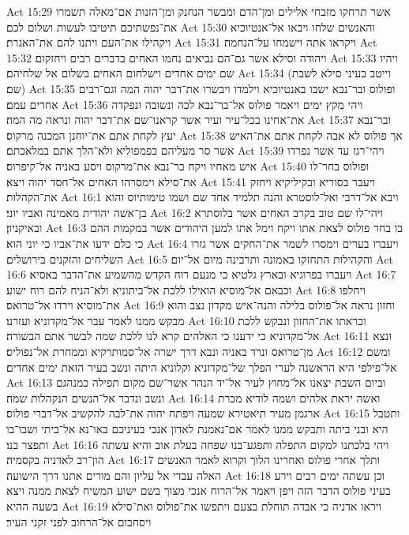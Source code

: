Act 15:29  אשר תרחקו מזבחי אלילים ומן־הדם ומבשר הנחנק ומן־הזנות אם־מאלה תשמרו את־נפשתיכם תיטיבו לעשות ושלום לכם׃
Act 15:30  והאנשים שלחו ויבאו אל־אנטיוכיא ויקהילו את־העם ויתנו להם את־האגרת׃
Act 15:31  ויקראו אתה וישמחו על־הנחמה׃
Act 15:32  ויהודה וסילא אשר גם־הם נביאים נחמו האחים בדברים רבים ויחזקום׃
Act 15:33  ויהיו שם ימים אחדים וישלחום האחים בשלום אל שלחיהם׃
Act 15:34  (וייטב בעיני סילא לשבת שם׃)
Act 15:35  ופולוס ובר־נבא ישבו באנטיוכיא וילמדו ויבשרו את־דבר יהוה המה וגם־רבים אחרים עמם׃
Act 15:36  ויהי מקץ ימים ויאמר פולוס אל־בר־נבא לכה ונשובה ונפקדה את־אחינו בכל־עיר ועיר אשר קראנו־שם את־דבר יהוה ונראה מה המה׃
Act 15:37  ובר־נבא יעץ לקחת אתם את־יוחנן המכנה מרקוס׃
Act 15:38  אך פולוס לא אבה לקחת אתם את־האיש אשר סר מעליהם בפמפוליא ולא־הלך אתם במלאכתם׃
Act 15:39  ויהי־רגז עד אשר נפרדו איש מאחיו ויקח בר־נבא את־מרקוס ויסע באניה אל־קיפרוס׃
Act 15:40  ופולוס בחר־לו את־סילא וימסרהו האחים אל־חסד יהוה ויצא׃
Act 15:41  ויעבר בסוריא ובקיליקיא ויחזק את־הקהלות׃
Act 16:1  ויבא אל־דרבי ואל־לוסטרא והנה תלמיד אחד שם ושמו טימותיוס והוא בן־אשה יהודית מאמינה ואביו יוני׃
Act 16:2  ויהי־לו שם טוב בקרב האחים אשר בלוסתרא ובאיקניון׃
Act 16:3  בו בחר פולוס לצאת אתו ויקח וימל אתו למען היהודים אשר במקמות ההם כי כלם ידעו את־אביו כי יוני הוא׃
Act 16:4  ויעברו בערים וימסרו לשמר את־החקים אשר גזרו השליחים והזקנים בירושלים׃
Act 16:5  והקהילות התחזקו באמונה ותרבינה מיום אל־יום׃
Act 16:6  ויעברו בפרוגיא ובארץ גלטיא כי מנעם רוח הקדש מהשמיע את־הדבר באסיא׃
Act 16:7  וכבאם אל־מוסיא הואילו ללכת אל־ביתוניא ולא־הניח להם רוח ישוע׃
Act 16:8  ויחלפו את־מוסיא וירדו אל־טרואס׃
Act 16:9  וחזון נראה אל־פולוס בלילה והנה־איש מקדון נצב והוא מבקש ממנו לאמר עבר אל־מקדוניא ועזרנו׃
Act 16:10  וכראתו את־החזון ונבקש ללכת אל־מקדוניא כי ידענו כי האלהים קרא לנו ללכת שמה לבשר אתם הבשורה׃
Act 16:11  ונצא מן־טרואס ונרד באניה ונבא דרך ישרה אל־סמותרקיא וממחרת אל־נפוליס׃
Act 16:12  ומשם אל־פילפי היא הראשנה לערי הפלך של־מקדוניא וקלוניא היתה ונשב בעיר הזאת ימים אחדים׃
Act 16:13  וביום השבת יצאנו אל־מחוץ לעיר אל־יד הנהר אשר־שם מקום תפילה כמנהגם ונשב ונדבר אל־הנשים הנקהלות שמה׃
Act 16:14  ואשה יראת אלהים ושמה לודיא מכרת ארגמן מעיר תיאטירא שמעה ויפתח יהוה את־לבה להקשיב אל־דברי פולוס׃
Act 16:15  ותטבל היא ובני ביתה ותבקש ממנו לאמר אם־נאמנת לאדון אנכי בעיניכם באו־נא אל־ביתי ושבו־בו ותפצר בנו׃
Act 16:16  ויהי בלכתנו למקום התפלה ותפגע־בנו שפחה בעלת אוב והיא עשתה הון־רב לאדניה בקסמיה׃
Act 16:17  ותלך אחרי פולוס ואחרינו הלוך וקרוא לאמר האנשים האלה עבדי אל עליון והם מורים אתנו דרך הישועה׃
Act 16:18  וכן עשתה ימים רבים וירע בעיני פולוס הדבר הזה ויפן ויאמר אל־הרוח אנכי מצוך בשם ישוע המשיח לצאת ממנה ויצא בשעה ההיא׃
Act 16:19  ויראו אדניה כי אבדה תוחלת בצעם ויתפשו את־פולוס ואת־סילא ויסחבום אל־הרחוב לפני זקני העיר׃
